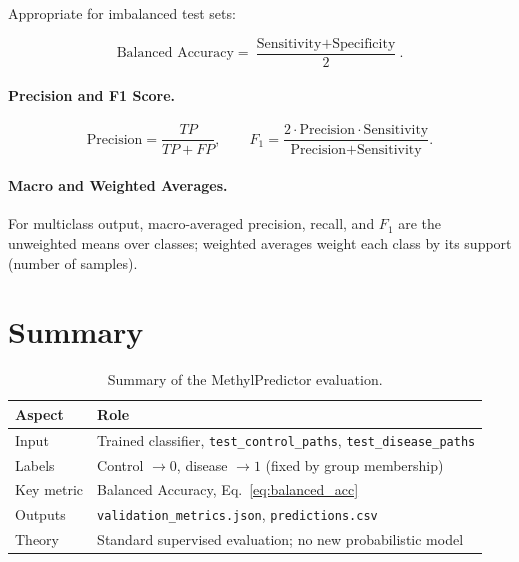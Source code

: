 \documentclass[11pt]{article}
\begin{document}
Appropriate for imbalanced test sets:

\begin{equation}
  \text{Balanced Accuracy} = \frac{\text{Sensitivity} + \text{Specificity}}{2}.
  \label{eq:balanced_acc}
\end{equation}

\paragraph{Precision and F1 Score.}

\begin{equation}
  \text{Precision} = \frac{TP}{TP + FP}, \qquad
  F_1 = \frac{2 \cdot \text{Precision} \cdot \text{Sensitivity}}
             {\text{Precision} + \text{Sensitivity}}.
\end{equation}

\paragraph{Macro and Weighted Averages.}

For multiclass output, macro-averaged precision, recall, and $F_1$ are the
unweighted means over classes; weighted averages weight each class by its
support (number of samples).

\section{Summary}

\begin{table}[h]
\centering
\begin{tabular}{@{}ll@{}}
\toprule
Aspect & Role \\
\midrule
Input & Trained classifier, \texttt{test\_control\_paths},
        \texttt{test\_disease\_paths} \\
Labels & Control $\to 0$, disease $\to 1$ (fixed by group membership) \\
Key metric & Balanced Accuracy, Eq.~\eqref{eq:balanced_acc} \\
Outputs & \texttt{validation\_metrics.json}, \texttt{predictions.csv} \\
Theory & Standard supervised evaluation; no new probabilistic model \\
\bottomrule
\end{tabular}
\caption{Summary of the MethylPredictor evaluation.}
\end{table}
\end{document}
